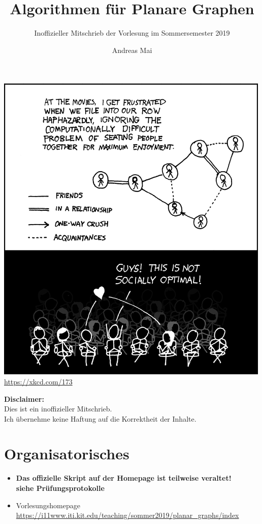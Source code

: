 \documentclass[parskip=full]{scrartcl}
\title{Algorithmen für Planare Graphen}
\subtitle{Inoffizieller Mitschrieb der Vorlesung im Sommersemester 2019}
\author{Andreas Mai}
\date{} %
\begin{document}
\maketitle
\begin{center}
\includegraphics[scale=0.7]{movie_seating}\\
\url{https://xkcd.com/173}
\end{center}

\clearpage
\tableofcontents
{}
\setcounter{page}{1}

\textbf{Disclaimer: } \\
Dies ist ein inoffizieller Mitschrieb.\\
Ich übernehme keine Haftung auf die Korrektheit der Inhalte.

\clearpage

\section{Organisatorisches}
\begin{itemize}
  \item \textbf{Das offizielle Skript auf der Homepage ist teilweise veraltet!\\ siehe Prüfungsprotokolle}
  \item Vorlesungshomepage\\
  \url{https://i11www.iti.kit.edu/teaching/sommer2019/planar_graphs/index}
\end{itemize}
\end{document}

